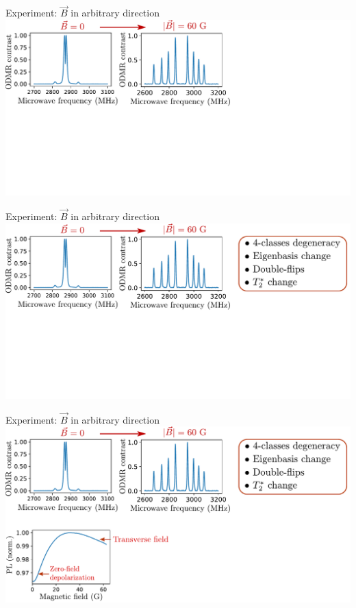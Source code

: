 \documentclass{beamer}
\begin{document}
\begin{frame}{Experiment: $\vec B$ in arbitrary direction}
\centering
\includegraphics[width=\textwidth,height=0.85\textheight,keepaspectratio]{Slide_T1_PL_1x1x1x1_f-5}
\end{frame}

\begin{frame}{Experiment: $\vec B$ in arbitrary direction}
\centering
\includegraphics[width=\textwidth,height=0.85\textheight,keepaspectratio]{Slide_T1_PL_1x1x1x1_f-4}
\end{frame}

\begin{frame}{Experiment: $\vec B$ in arbitrary direction}
\centering
\includegraphics[width=\textwidth,height=0.85\textheight,keepaspectratio]{Slide_T1_PL_1x1x1x1_f-3}
\end{frame}
\end{document}
